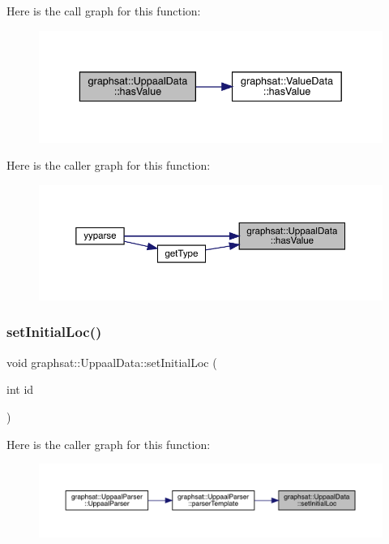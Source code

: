 Here is the call graph for this function\+:\nopagebreak
\begin{figure}[H]
\begin{center}
\leavevmode
\includegraphics[width=336pt]{classgraphsat_1_1_uppaal_data_ac64e8295d429d836f76bbec12eb7fa76_cgraph}
\end{center}
\end{figure}
Here is the caller graph for this function\+:\nopagebreak
\begin{figure}[H]
\begin{center}
\leavevmode
\includegraphics[width=350pt]{classgraphsat_1_1_uppaal_data_ac64e8295d429d836f76bbec12eb7fa76_icgraph}
\end{center}
\end{figure}
\mbox{\label{classgraphsat_1_1_uppaal_data_a00ac5e60eb80a5e7684653a9ff81c6a2}} 
\subsubsection{\texorpdfstring{setInitialLoc()}{setInitialLoc()}}
{\footnotesize\ttfamily void graphsat\+::\+Uppaal\+Data\+::set\+Initial\+Loc (\begin{DoxyParamCaption}\item[{int}]{id }\end{DoxyParamCaption})\hspace{0.3cm}{\ttfamily [inline]}}

Here is the caller graph for this function\+:\nopagebreak
\begin{figure}[H]
\begin{center}
\leavevmode
\includegraphics[width=350pt]{classgraphsat_1_1_uppaal_data_a00ac5e60eb80a5e7684653a9ff81c6a2_icgraph}
\end{center}
\end{figure}


